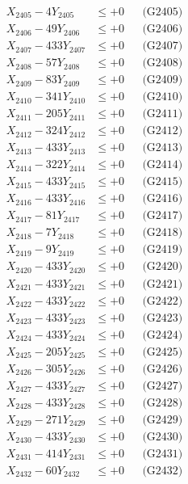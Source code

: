 \documentclass[a4paper,10pt]{article}
\begin{document}
{\begin{align}
X_{2405} - 4Y_{2405} &\leq +0 && \text{(G2405)} \\
X_{2406} - 49Y_{2406} &\leq +0 && \text{(G2406)} \\
X_{2407} - 433Y_{2407} &\leq +0 && \text{(G2407)} \\
X_{2408} - 57Y_{2408} &\leq +0 && \text{(G2408)} \\
X_{2409} - 83Y_{2409} &\leq +0 && \text{(G2409)} \\
X_{2410} - 341Y_{2410} &\leq +0 && \text{(G2410)} \\
\allowbreak
X_{2411} - 205Y_{2411} &\leq +0 && \text{(G2411)} \\
X_{2412} - 324Y_{2412} &\leq +0 && \text{(G2412)} \\
X_{2413} - 433Y_{2413} &\leq +0 && \text{(G2413)} \\
X_{2414} - 322Y_{2414} &\leq +0 && \text{(G2414)} \\
X_{2415} - 433Y_{2415} &\leq +0 && \text{(G2415)} \\
X_{2416} - 433Y_{2416} &\leq +0 && \text{(G2416)} \\
X_{2417} - 81Y_{2417} &\leq +0 && \text{(G2417)} \\
X_{2418} - 7Y_{2418} &\leq +0 && \text{(G2418)} \\
X_{2419} - 9Y_{2419} &\leq +0 && \text{(G2419)} \\
X_{2420} - 433Y_{2420} &\leq +0 && \text{(G2420)} \\
\allowbreak
X_{2421} - 433Y_{2421} &\leq +0 && \text{(G2421)} \\
X_{2422} - 433Y_{2422} &\leq +0 && \text{(G2422)} \\
X_{2423} - 433Y_{2423} &\leq +0 && \text{(G2423)} \\
X_{2424} - 433Y_{2424} &\leq +0 && \text{(G2424)} \\
X_{2425} - 205Y_{2425} &\leq +0 && \text{(G2425)} \\
X_{2426} - 305Y_{2426} &\leq +0 && \text{(G2426)} \\
X_{2427} - 433Y_{2427} &\leq +0 && \text{(G2427)} \\
X_{2428} - 433Y_{2428} &\leq +0 && \text{(G2428)} \\
X_{2429} - 271Y_{2429} &\leq +0 && \text{(G2429)} \\
X_{2430} - 433Y_{2430} &\leq +0 && \text{(G2430)} \\
\allowbreak
X_{2431} - 414Y_{2431} &\leq +0 && \text{(G2431)} \\
X_{2432} - 60Y_{2432} &\leq +0 && \text{(G2432)} \\

\end{align}}
\end{document}
